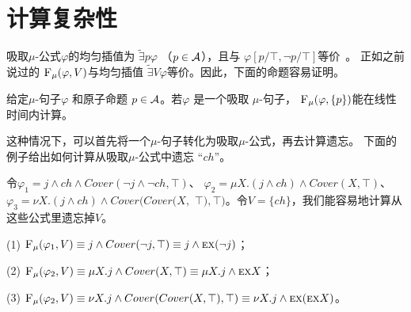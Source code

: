 \section{计算复杂性}
吸取$\mu$-公式$\varphi$的均匀插值为 $\widetilde{\exists}p \varphi$ （$p\in {\cal A}$），且与 $\varphi[p/\top,\neg p/\top]$等价~\cite{d2006modal}。
正如之前说过的 ${\textsc{F}_{\textsc{$\mu$}}}(\varphi, V)$与均匀插值 $\widetilde{\exists}V \varphi$等价\cite{d2006modal}。因此，下面的命题容易证明。
\begin{proposition}\label{pro:disLiT}
	给定$\mu$-句子$\varphi$ 和原子命题 $p\in {\cal A}$。若$\varphi$ 是一个吸取 $\mu$-句子， ${\textsc{F}_{\textsc{$\mu$}}}(\varphi, \{p\})$能在线性时间内计算。
\end{proposition}

这种情况下，可以首先将一个$\mu$-句子转化为吸取$\mu$-公式，再去计算遗忘。
下面的例子给出如何计算从吸取$\mu$-公式中遗忘 “$ch$”。
\begin{example}
	令$\varphi_1=  j \wedge ch \wedge Cover(\neg j \wedge \neg ch, \top)$、 $ \varphi_2= \mu X. (j \wedge ch) \wedge Cover(X, \top)$、 $\varphi_3=  \nu X. (j \wedge ch) \wedge Cover(Cover(X,$ $\top), \top)$。令$V=\{ch\}$，我们能容易地计算从这些公式里遗忘掉$V$。
	
	(1) ${\textsc{F}_{\textsc{$\mu$}}}(\varphi_1, V) \equiv j \wedge Cover(\neg j, \top) \equiv j \wedge \textsc{e} \textsc{x}(\neg j)$；
	
	(2) ${\textsc{F}_{\textsc{$\mu$}}}(\varphi_2, V) \equiv \mu X. j  \wedge Cover(X, \top) \equiv \mu X. j \wedge \textsc{e} \textsc{x} X$；
	
	(3) ${\textsc{F}_{\textsc{$\mu$}}}(\varphi_2, V) \equiv \nu X. j \wedge Cover(Cover(X, \top), \top) \equiv \nu X. j \wedge \textsc{e} \textsc{x}(\textsc{e} \textsc{x} X)$。
\end{example}

